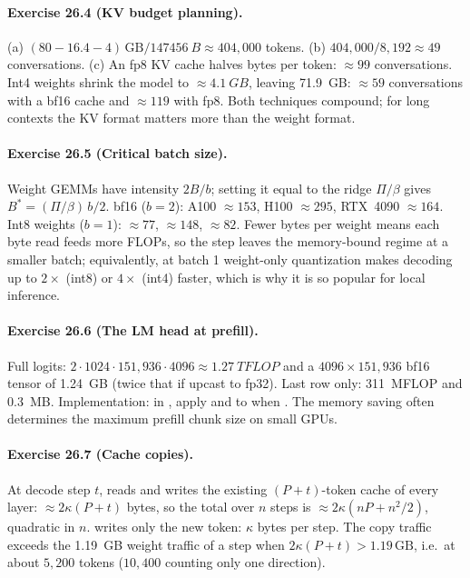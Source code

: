 \paragraph{Exercise 26.4 (KV budget planning).}
(a) $(80-16.4-4)\,\text{GB}/\SI{147456}{B}\approx404{,}000$ tokens. (b) $404{,}000/8{,}192\approx49$ conversations.
(c) An fp8 KV cache halves bytes per token: $\approx99$ conversations. Int4 weights shrink the model to
$\approx\SI{4.1}{GB}$, leaving \SI{71.9}{GB}: $\approx59$ conversations with a bf16 cache and $\approx119$ with fp8.
Both techniques compound; for long contexts the KV format matters more than the weight format.

\paragraph{Exercise 26.5 (Critical batch size).}
Weight GEMMs have intensity $2B/b$; setting it equal to the ridge $\Pi/\beta$ gives $B^*=(\Pi/\beta)\,b/2$.
bf16 ($b=2$): A100 $\approx153$, H100 $\approx295$, RTX~4090 $\approx164$. Int8 weights ($b=1$): $\approx77$, $\approx148$,
$\approx82$. Fewer bytes per weight means each byte read feeds more FLOPs, so the step leaves the memory-bound
regime at a smaller batch; equivalently, at batch 1 weight-only quantization makes decoding up to
$2\times$ (int8) or $4\times$ (int4) faster, which is why it is so popular for local inference.

\paragraph{Exercise 26.6 (The LM head at prefill).}
Full logits: $2\cdot1024\cdot151{,}936\cdot4096\approx\SI{1.27}{TFLOP}$ and a $4096\times151{,}936$ bf16 tensor of
\SI{1.24}{GB} (twice that if upcast to fp32). Last row only: \SI{311}{MFLOP} and \SI{0.3}{MB}. Implementation:
in , apply  and  to  when . The memory saving
often determines the maximum prefill chunk size on small GPUs.

\paragraph{Exercise 26.7 (Cache copies).}
At decode step $t$,  reads and writes the existing $(P+t)$-token cache of every layer:
$\approx2\kappa(P+t)$ bytes, so the total over $n$ steps is $\approx2\kappa(nP+n^2/2)$, quadratic in $n$.
 writes only the new token: $\kappa$ bytes per step. The copy traffic exceeds the
\SI{1.19}{GB} weight traffic of a step when $2\kappa(P+t)>1.19\,\text{GB}$, i.e.\ at about $5{,}200$ tokens
($10{,}400$ counting only one direction).

